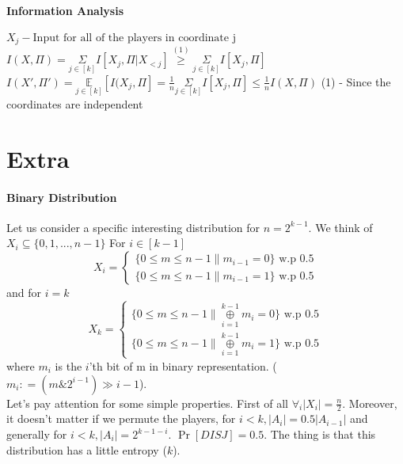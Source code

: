 \documentclass{article}
\theoremstyle{plain}
\begin{document}
\paragraph{Information Analysis}
$X_j - \text{Input for all of the players in coordinate j}$ \newline
$I(X, \Pi) = \underset{j\in[k]}{\Sigma} I[X_j, \Pi | X_{<j}] \overset{(1)}{\geq } \underset{j\in[k]}{\Sigma} I[X_j, \Pi]$ \newline
$I(X', \Pi ') = \underset{j \in [k]}{\mathbb{E}}[I(X_j, \Pi] = \frac{1}{n}\underset{j\in[k]}{\Sigma} I[X_j, \Pi] \leq \frac{1}{n}I(X, \Pi)$ \newline
(1) - Since the coordinates are independent

\section{Extra}
\paragraph{Binary Distribution}
Let us consider a specific interesting distribution for $n = 2^{k-1}$. We think of $X_i \subseteq \{0, 1, ... , n-1\} $ \newline
For $i \in [k-1]$
  \[
    X_i=\left\{
                \begin{array}{ll}
                  \{0 \leq m \leq n-1 \| m_{i-1} = 0\} \text{ w.p 0.5} \\
                  \{0 \leq m \leq n-1 \| m_{i-1} = 1\} \text{ w.p 0.5}
                \end{array}
              \right.
  \]
and for $i = k$
  \[
    X_k=\left\{
                \begin{array}{ll}
                  \{0 \leq m \leq n-1 \| \underset{i=1}{\overset{k-1}{\oplus}} m_i = 0\} \text{ w.p 0.5} \\
                  \{0 \leq m \leq n-1 \| \underset{i=1}{\overset{k-1}{\oplus}} m_i = 1\} \text{ w.p 0.5}
                \end{array}
              \right.
  \]
where $m_i$ is the $i$'th bit of m in binary representation. ($m_i \mathrel{\mathop:}= ( m \mathop{\&} 2^{i-1} ) \gg i-1 $). \\
Let's pay attention for some simple properties. First of all $\forall_i |X_i| = \frac{n}{2}$. Moreover, it doesn't matter if we permute the players, for $i < k, |A_i| = 0.5|A_{i-1}|$ and generally for $i < k, |A_i| = 2^{k-1-i}$. $\Pr[DISJ] = 0.5$. The thing is that this distribution has a little entropy ($k$).
\end{document}
